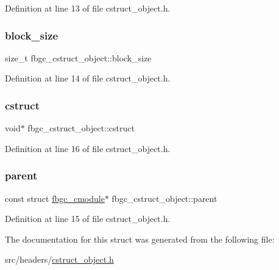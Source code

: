 Definition at line 13 of file cstruct\+\_\+object.\+h.

\mbox{\label{structfbgc__cstruct__object_a6246dee94eecb694e50cbb196f234523}} 
\subsubsection{\texorpdfstring{block\+\_\+size}{block\_size}}
{\footnotesize\ttfamily size\+\_\+t fbgc\+\_\+cstruct\+\_\+object\+::block\+\_\+size}



Definition at line 14 of file cstruct\+\_\+object.\+h.

\mbox{\label{structfbgc__cstruct__object_a04ff6121d5b752d186800c1631771588}} 
\subsubsection{\texorpdfstring{cstruct}{cstruct}}
{\footnotesize\ttfamily void$\ast$ fbgc\+\_\+cstruct\+\_\+object\+::cstruct}



Definition at line 16 of file cstruct\+\_\+object.\+h.

\mbox{\label{structfbgc__cstruct__object_a2b5d0862bce151a1e64f5efd63a6c789}} 
\subsubsection{\texorpdfstring{parent}{parent}}
{\footnotesize\ttfamily const struct \hyperlink{structfbgc__cmodule}{fbgc\+\_\+cmodule}$\ast$ fbgc\+\_\+cstruct\+\_\+object\+::parent}



Definition at line 15 of file cstruct\+\_\+object.\+h.



The documentation for this struct was generated from the following file\+:\begin{DoxyCompactItemize}
\item 
src/headers/\hyperlink{cstruct__object_8h}{cstruct\+\_\+object.\+h}\end{DoxyCompactItemize}
